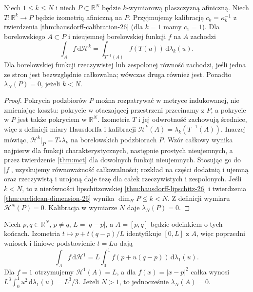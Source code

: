 \begin{wniosek}
\label{it:cor:hausdorff-affine-integration}
Niech $1\le k\le N$ i niech $P\subset\mathbb R^N$
będzie $k$-wymiarową płaszczyzną afiniczną.
Niech $T:\mathbb R^k\to P$ będzie izometrią afiniczną
na $P$. Przyjmujemy kalibrację
$c_k=\kappa_k^{-1}$ z twierdzenia
\ref{thm:hausdorff-calibration-26} (dla $k=1$ mamy $c_1=1$).
Dla borelowskiego $A\subset P$ i nieujemnej borelowskiej
funkcji $f$ na $A$ zachodzi
\[
 \int_A f\,\mathrm d\mathcal H^k
 =\int_{T^{-1}(A)} f(T(u))\,\mathrm d\lambda_k(u).
\]
Dla borelowskiej funkcji rzeczywistej lub zespolonej
równość zachodzi, jeśli jedna ze stron jest bezwzględnie
całkowalna; wówczas druga również jest.
Ponadto $\lambda_N(P)=0$, jeżeli $k<N$.
\end{wniosek}
\begin{proof}
Pokrycia podzbiorów $P$ można rozpatrywać w metryce
indukowanej, nie zmieniając kosztu: pokrycie w otaczającej
przestrzeni przecinamy z $P$, a pokrycie w $P$ jest
także pokryciem w $\mathbb R^N$.
Izometria $T$ i jej odwrotność zachowują średnice,
więc z definicji miary Hausdorffa i kalibracji
$\mathcal H^k(A)=\lambda_k(T^{-1}(A))$.
Inaczej mówiąc, $\mathcal H^k|_P=T_*\lambda_k$
na borelowskich podzbiorach $P$.
Wzór całkowy wynika najpierw dla funkcji charakterystycznych,
następnie prostych nieujemnych, a przez twierdzenie
\ref{thm:mct} dla dowolnych funkcji nieujemnych.
Stosując go do $|f|$, uzyskujemy równoważność
całkowalności; rozkład na części dodatnią i ujemną
oraz rzeczywistą i urojoną daje tezę dla całek
rzeczywistych i zespolonych.
Jeśli $k<N$, to z nierówności lipschitzowskiej
\ref{thm:hausdorff-lipschitz-26} i
twierdzenia \ref{thm:euclidean-dimension-26} wynika
$\dim_H P\le k<N$. Z definicji wymiaru
$\mathcal H^N(P)=0$. Kalibracja w wymiarze $N$
daje $\lambda_N(P)=0$.
\end{proof}

\begin{przyklad}
Niech $p,q\in\mathbb R^N$, $p\ne q$, $L=|q-p|$,
a $A=[p,q]$ będzie odcinkiem o tych końcach.
Izometria $t\mapsto p+t(q-p)/L$ identyfikuje
$[0,L]$ z $A$, więc poprzedni wniosek i liniowe
podstawienie $t=Lu$ dają
\[
 \int_A f\,\mathrm d\mathcal H^1
 =L\int_0^1 f(p+u(q-p))\,\mathrm d\lambda_1(u).
\]
Dla $f=1$ otrzymujemy $\mathcal H^1(A)=L$,
a dla $f(x)=|x-p|^2$ całka wynosi
$L^3\int_0^1u^2\,\mathrm d\lambda_1(u)=L^3/3$.
Jeżeli $N>1$, to jednocześnie $\lambda_N(A)=0$.
\end{przyklad}

